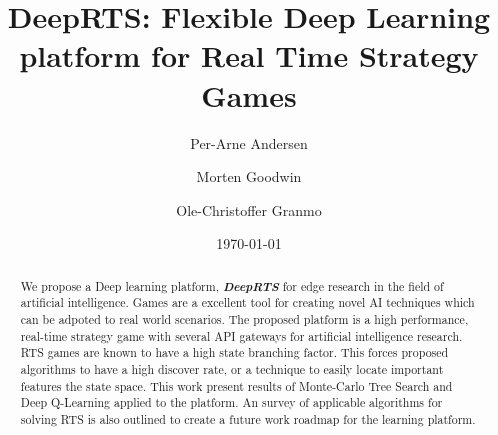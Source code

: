 \documentclass[fleqn,10pt]{article} %
\title{DeepRTS: Flexible Deep Learning platform for Real Time Strategy Games}
\date{\today}
\author{Per-Arne Andersen \and Morten Goodwin \and Ole-Christoffer Granmo}
\begin{document}
\flushbottom %
\maketitle %
\begin{abstract}
We propose a Deep learning platform, \textit{\textbf{DeepRTS}} for edge research in the field of artificial intelligence. 
Games are a excellent tool for creating novel AI techniques which can be adpoted to real world scenarios. The proposed platform is a high performance, real-time strategy game with several API gateways for artificial intelligence research. RTS games are known to have a high state branching factor. This forces proposed algorithms to have a high discover rate, or a technique to easily locate important features the state space. This work present results of Monte-Carlo Tree Search and Deep Q-Learning applied to the platform. An survey of applicable algorithms for solving RTS is also outlined to create a future work roadmap for the learning platform.
\end{abstract}

\newpage

\tableofcontents %

\thispagestyle{empty} %
\newpage
\end{document}
